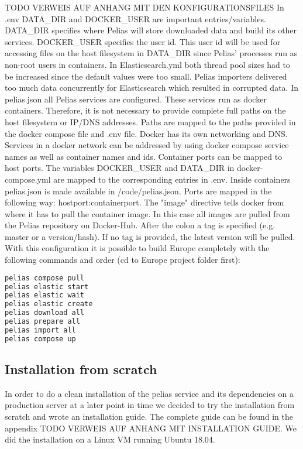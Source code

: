 TODO VERWEIS AUF ANHANG MIT DEN KONFIGURATIONSFILES
In .env DATA{\_}DIR and DOCKER{\_}USER are important entries/variables. DATA{\_}DIR specifies where Pelias will store downloaded data and build its other services. DOCKER{\_}USER specifies the user id. This user id will be used for accessing files on the host filesystem in DATA{\_}DIR since Pelias' processes run as non-root users in containers.
In Elasticsearch.yml both thread pool sizes had to be increased since the default values were too small. Pelias importers delivered too much data concurrently for Elasticsearch which resulted in corrupted data.
In pelias.json all Pelias services are configured. These services run as docker containers. Therefore, it is not necessary to provide complete full paths on the host filesystem or IP/DNS addresses. Paths are mapped to the paths provided in the docker compose file  and .env file. Docker has its own networking and DNS. Services in a docker network can be addressed by using docker compose service names as well as container names and ids. Container ports can be mapped to host ports.
The variables DOCKER{\_}USER and DATA{\_}DIR in docker-compose.yml are mapped to the corresponding entries in .env. Inside containers pelias.json is made available in /code/pelias.json. Ports are mapped in the following way:
hostport:containerport.
The "image" directive tells docker from where it has to pull the container image. In this case all images are pulled from the Pelias repository on Docker-Hub. After the colon a tag is specified (e.g. master or a version/hash). If no tag is provided, the latest version will be pulled.
With this configuration it is possible to build Europe completely with the following commands and order (cd to Europe project folder first):
\begin{lstlisting}[language=bash,breaklines=true]
pelias compose pull
pelias elastic start
pelias elastic wait
pelias elastic create
pelias download all
pelias prepare all
pelias import all
pelias compose up
\end{lstlisting}

\subsection{Installation from scratch}
In order to do a clean installation of the pelias service and its dependencies on a production server at a later point in time we decided to try the installation from scratch and wrote an installation guide. The complete guide can be found in the appendix TODO VERWEIS AUF ANHANG MIT INSTALLATION GUIDE. We did the installation on a Linux VM running Ubuntu 18.04.

